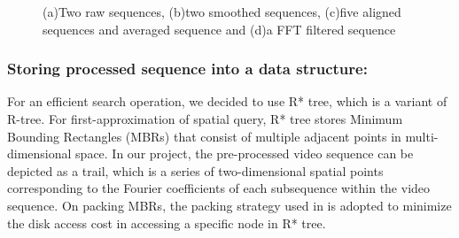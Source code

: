 \begin{figure}[!t]
	\centering
	\caption{(a)Two raw sequences, (b)two smoothed sequences, (c)five aligned sequences and averaged sequence and (d)a FFT filtered sequence}
\vspace{-5mm}
\end{figure}

\subsubsection{Storing processed sequence into a data structure:} 
For an efficient search operation, we decided to use R* tree\cite{Beckmann:1990}, which is a variant of R-tree. For first-approximation of spatial query, R* tree stores Minimum Bounding Rectangles (MBRs) that consist of multiple adjacent points in multi-dimensional space. In our project, the pre-processed video sequence can be depicted as a trail, which is a series of two-dimensional spatial points corresponding to the Fourier coefficients of each subsequence within the video sequence. On packing MBRs, the packing strategy used in \cite{Faloutsos:1994}\cite{Kamel:1993} is adopted to minimize the disk access cost in accessing a specific node in R* tree.